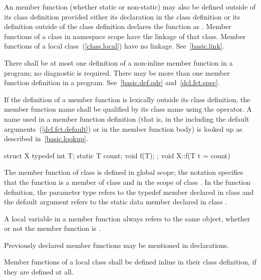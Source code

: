 \pnum
An  member function (whether static or non-static) may
also be defined outside of its class definition provided either its
declaration in the class definition or its definition outside of the
class definition declares the function as .
\enternote
Member functions of a class in namespace scope have the linkage of that class.
Member functions of a local class~(\ref{class.local}) have no linkage.
See~\ref{basic.link}.
\exitnote

\pnum
There shall be at most one definition of a non-inline member function in
a program; no diagnostic is required. There may be more than one
 member function definition in a program.
See~\ref{basic.def.odr} and~\ref{dcl.fct.spec}.

\pnum
{}%
If the definition of a member function is lexically outside its class
definition, the member function name shall be qualified by its class
name using the \tcode{::} operator.
\enternote
A name used in a member function definition (that is, in the
 including the default
arguments~(\ref{dcl.fct.default}) or in the member function body) is looked up
as described in~\ref{basic.lookup}.
\exitnote
\enterexample

\begin{codeblock}
struct X {
  typedef int T;
  static T count;
  void f(T);
};
void X::f(T t = count) { }
\end{codeblock}

The member function  of class  is defined in global
scope; the notation  specifies that the function 
is a member of class  and in the scope of class . In
the function definition, the parameter type  refers to the
typedef member  declared in class  and the default
argument  refers to the static data member 
declared in class .
\exitexample

\pnum
A  local variable in a member function always refers to
the same object, whether or not the member function is .

\pnum
Previously declared member functions may be mentioned in  declarations.

\pnum
{}%
Member functions of a local class shall be defined inline in their class
definition, if they are defined at all.

